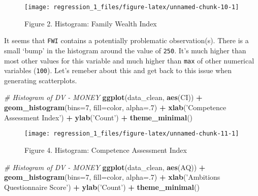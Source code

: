 \documentclass[]{article}
\newenvironment{Shaded}{\begin{snugshade}}{\end{snugshade}}
\newcommand{\CommentTok}[1]{\textcolor[rgb]{0.56,0.35,0.01}{\textit{#1}}}
\newcommand{\DataTypeTok}[1]{\textcolor[rgb]{0.13,0.29,0.53}{#1}}
\newcommand{\DecValTok}[1]{\textcolor[rgb]{0.00,0.00,0.81}{#1}}
\newcommand{\KeywordTok}[1]{\textcolor[rgb]{0.13,0.29,0.53}{\textbf{#1}}}
\newcommand{\NormalTok}[1]{#1}
\newcommand{\OperatorTok}[1]{\textcolor[rgb]{0.81,0.36,0.00}{\textbf{#1}}}
\newcommand{\StringTok}[1]{\textcolor[rgb]{0.31,0.60,0.02}{#1}}
\begin{document}
\begin{figure}

{\centering \texttt{[image: regression\_1\_files/figure-latex/unnamed-chunk-10-1]} 

}

\caption{Figure 2. Histogram: Family Wealth Index}\label{fig:unnamed-chunk-10}
\end{figure}

It seems that \texttt{FWI} contains a potentially problematic
observation(s). There is a small `bump' in the histogram around the
value of \texttt{250}. It's much higher than most other values for this
variable and much higher than \texttt{max} of other numerical variables
(\texttt{100}). Let's remeber about this and get back to this issue when
generating scatterplots.

\begin{Shaded}
\begin{Highlighting}[]
\CommentTok{# Histogram of DV - MONEY}
\KeywordTok{ggplot}\NormalTok{(data_clean, }\KeywordTok{aes}\NormalTok{(CI)) }\OperatorTok{+}\StringTok{ }\KeywordTok{geom_histogram}\NormalTok{(}\DataTypeTok{bins=}\DecValTok{7}\NormalTok{, }\DataTypeTok{fill=}\NormalTok{color, }\DataTypeTok{alpha=}\NormalTok{.}\DecValTok{7}\NormalTok{) }\OperatorTok{+}\StringTok{ }
\StringTok{                           }\KeywordTok{xlab}\NormalTok{(}\StringTok{'Competence Assessment Index'}\NormalTok{) }\OperatorTok{+}\StringTok{ }
\StringTok{                           }\KeywordTok{ylab}\NormalTok{(}\StringTok{'Count'}\NormalTok{) }\OperatorTok{+}\StringTok{ }
\StringTok{                           }\KeywordTok{theme_minimal}\NormalTok{()}
\end{Highlighting}
\end{Shaded}

\begin{figure}

{\centering \texttt{[image: regression\_1\_files/figure-latex/unnamed-chunk-11-1]} 

}

\caption{Figure 4. Histogram: Competence Assessment Index}\label{fig:unnamed-chunk-11}
\end{figure}

\begin{Shaded}
\begin{Highlighting}[]
\CommentTok{# Histogram of DV - MONEY}
\KeywordTok{ggplot}\NormalTok{(data_clean, }\KeywordTok{aes}\NormalTok{(AQ)) }\OperatorTok{+}\StringTok{ }\KeywordTok{geom_histogram}\NormalTok{(}\DataTypeTok{bins=}\DecValTok{7}\NormalTok{, }\DataTypeTok{fill=}\NormalTok{color, }\DataTypeTok{alpha=}\NormalTok{.}\DecValTok{7}\NormalTok{) }\OperatorTok{+}\StringTok{ }
\StringTok{                           }\KeywordTok{xlab}\NormalTok{(}\StringTok{'Ambitions Questionnaire Score'}\NormalTok{) }\OperatorTok{+}\StringTok{ }
\StringTok{                           }\KeywordTok{ylab}\NormalTok{(}\StringTok{'Count'}\NormalTok{) }\OperatorTok{+}\StringTok{ }
\StringTok{                           }\KeywordTok{theme_minimal}\NormalTok{()}
\end{Highlighting}
\end{Shaded}
\end{document}
